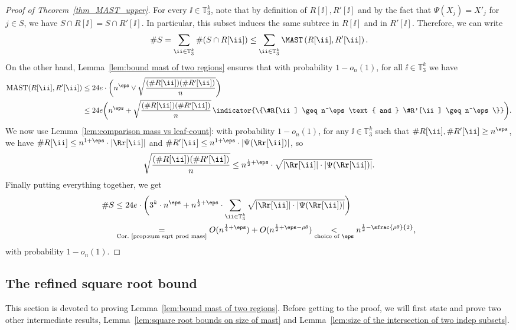 \begin{proof}[Proof of Theorem~\ref{thm_MAST_upper}]
For every $\ii \in \mathbb{T}_3^k$, note that by definition of $R[\ii], R'[\ii]$ and by the fact that \hbox{$\Psi(X_j)=X'_j$} for $j \in S$, we have $S \cap R[\ii]=S \cap R'[\ii]$. In particular, this subset induces the same subtree in $R[\ii]$ and in $R'[\ii]$. Therefore, we can write\vspace*{-3pt}
\[ \# S = \sum_{\ii \in \mathbb{T}_3^k} \#(S \cap R[\ii]) \leq \sum_{\ii \in \mathbb{T}_3^k} \MAST \left( R[\ii], R'[\ii] \right). \]
On the other hand, Lemma~\ref{lem:bound mast of two regions} ensures that with probability $1-o_n(1)$, for all $\ii \in \mathbb{T}_3^k$ we have\vspace*{-3pt}
\begin{align*}
\mathrm{MAST}(R[\ii] ,R'[\ii])
&\leq 24e \cdot \biggl(n^\eps \vee \sqrt{\frac{(\#R[\ii] )(\#R'[\ii] )}{n}}\biggr)\\
&\leq 24e \biggl(n^\eps + \sqrt{\frac{(\#R[\ii] )(\#R'[\ii] )}{n}}\,\indicator{\{\#R[\ii] \geq n^\eps \text{ and } \#R'[\ii] \geq n^\eps\}} \biggr).
\end{align*}
We now use Lemma~\ref{lem:comparison mass vs leaf-count}: with probability $1-o_n(1)$, for any $\ii \in \mathbb{T}_3^k$ such that $\#R[\ii], \#R'[\ii] \geq n^{\eps}$, we have $\#R[\ii]\leq n^{1+\eps}\cdot|\Rr[\ii]|$ and $\#R'[\ii] \leq n^{1+\eps}\cdot|\Psi(\Rr[\ii])|$, so
\begin{align*}
\sqrt{\frac{(\#R[\ii] )(\#R'[\ii])}{n}} \leq n^{\frac{1}{2}+\eps} \cdot \sqrt{|\Rr[\ii] | \cdot |\Psi(\Rr[\ii] )|}.
\end{align*}
Finally putting everything together, we get\vspace*{-3pt}
\begin{align*}
\#S & \leq 24 e \cdot \biggl( 3^k\cdot n^\eps + n^{\frac{1}{2}+\eps}\cdot \sum_{\ii \in \mathbb{T}_3^k} \sqrt{|\Rr[\ii] | \cdot |\Psi(\Rr[\ii])|}\biggr)\\
&\underset{\text{Cor.~\ref{prop:sum sqrt prod mass}}}{=} O(n^{\frac{1}{4}+\eps}) + O(n^{\frac{1}{2}+\eps -\rho \theta})\underset{\text{choice of $\eps$}}{<} n^{\frac{1}{2}-\sfrac{\rho \theta}{2}},
\end{align*}
with probability $1-o_n(1)$.
\end{proof}
\subsection{The refined square root bound}
This section is devoted to proving Lem\-ma~\ref{lem:bound mast of two regions}.
Before getting to the proof, we will first state and prove two other intermediate results, Lemma~\ref{lem:square root bounds on size of mast} and Lemma~\ref{lem:size of the intersection of two indep subsets}.

